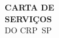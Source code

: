 \vspace*{\fill}

\begin{flushright}
\HUGE
\color{gray}
\textbf{CARTA DE\\SERVIÇOS}\\
DO CRP~SP
\end{flushright}